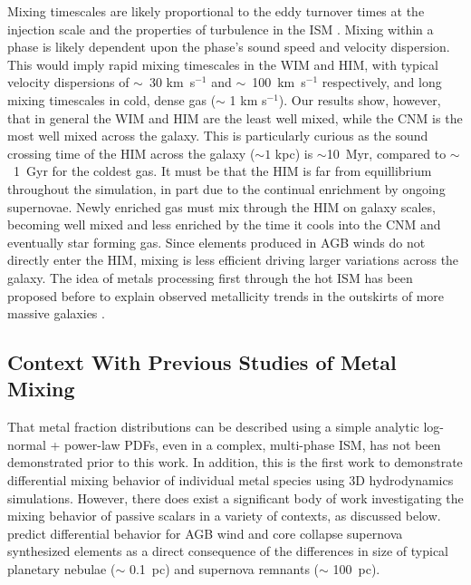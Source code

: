 \documentclass[twocolumn]{aastex61}
\begin{document}
%
%

Mixing timescales are likely proportional to the eddy turnover times at the injection scale \citep{PanScannapieco2010, Colbrook2017} and the properties of turbulence in the ISM \citep{YangKrumholz2012}. Mixing within a phase is likely dependent upon the phase's sound speed and velocity dispersion. This would imply rapid mixing timescales in the WIM and HIM, with typical velocity dispersions of $\sim$~30 km~s$^{-1}$ and $\sim$~100~km~s$^{-1}$ respectively, and long mixing timescales in cold, dense gas ($\sim$ 1 km s$^{-1}$). Our results show, however, that in general the WIM and HIM are the least well mixed, while the CNM is the most well mixed across the galaxy. This is particularly curious as the sound crossing time of the HIM across the galaxy ($\sim 1$ kpc) is $\sim$10~Myr, compared to $\sim$~1~Gyr for the coldest gas. It must be that the HIM is far from equillibrium throughout the simulation, in part due to the continual enrichment by ongoing supernovae. Newly enriched gas must mix through the HIM on galaxy scales, becoming well mixed and less enriched by the time it cools into the CNM and eventually star forming gas. Since elements produced in AGB winds do not directly enter the HIM, mixing is less efficient driving larger variations across the galaxy. The idea of metals processing first through the hot ISM has been proposed before to explain observed metallicity trends in the outskirts of more massive galaxies \citep{Tassis2008,Werk2011}.

\subsection{Context With Previous Studies of Metal Mixing}
\label{sec:context}
That metal fraction distributions can be described using a simple analytic log-normal + power-law PDFs, even in a complex, multi-phase ISM, has not been demonstrated prior to this work.   In addition, this is the first work to demonstrate differential mixing behavior of individual metal species using 3D hydrodynamics simulations. However, there does exist a significant body of work investigating the mixing behavior of passive scalars in a variety of contexts, as discussed below. \cite{KrumholzTing2018} predict differential behavior for AGB wind and core collapse supernova synthesized elements as a direct consequence of the differences in size of typical planetary nebulae ($\sim$ 0.1~pc) and supernova remnants ($\sim$ 100~pc).
\end{document}
